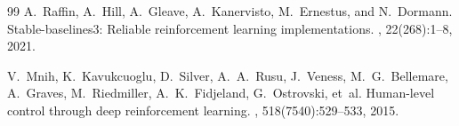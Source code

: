 \documentclass[11pt]{article}
\begin{document}
\begin{thebibliography}{99}
A.~Raffin, A.~Hill, A.~Gleave, A.~Kanervisto, M.~Ernestus, and N.~Dormann.
\newblock Stable-baselines3: Reliable reinforcement learning implementations.
, 22(268):1--8, 2021.

V.~Mnih, K.~Kavukcuoglu, D.~Silver, A.~A.~Rusu, J.~Veness, M.~G.~Bellemare,
  A.~Graves, M.~Riedmiller, A.~K.~Fidjeland, G.~Ostrovski, et~al.
\newblock Human-level control through deep reinforcement learning.
, 518(7540):529--533, 2015.

\end{thebibliography}
\end{document}
